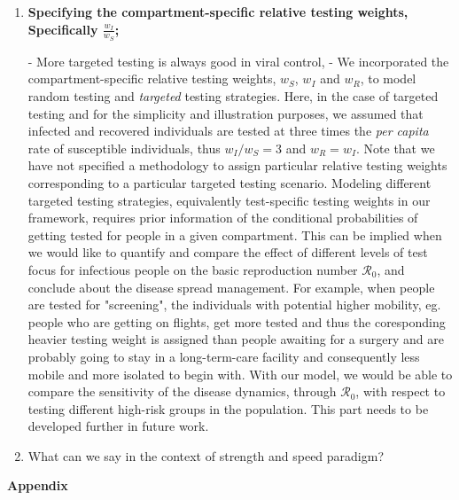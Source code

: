 \documentclass[12pt]{article}
\newcommand{\percap}{\emph{per capita}\xspace}
\newcommand{\Rnum}{\ensuremath{\mathcal{R}_0}}
\DeclareRobustCommand\_{\ifmmode\expandafter\subtxt\else\textunderscore\fi}
\theoremstyle{definition} %
\begin{document}
\begin{enumerate}
\item {\bf Specifying the compartment-specific relative testing weights, Specifically $\frac{w_I}{w_S}$;}

- More targeted testing is always good in viral control,
- We incorporated the compartment-specific relative testing weights, $w_S$, $w_I$ and $w_R$, to model random testing and \emph{targeted} testing strategies. Here, in the case of targeted testing and for the simplicity and illustration purposes, we assumed that infected and recovered individuals are tested at three times the \percap rate of susceptible individuals, thus $w_I/w_S=3$ and $w_R=w_I$. Note that we have not specified a methodology to assign particular relative testing weights corresponding to a particular targeted testing scenario. 
Modeling different targeted testing strategies, equivalently test-specific testing weights in our framework, requires prior information of the conditional probabilities of getting tested for people in a given compartment. 
This can be implied when we would like to quantify and compare the effect of different levels of test focus for infectious people on the basic reproduction number $\Rnum$, and conclude about the disease spread management. For example, when people are tested for "screening", the individuals with potential higher mobility, eg. people who are getting on flights, get more tested and thus the coresponding heavier testing weight is assigned than people awaiting for a surgery and are probably going to stay in a long-term-care facility and consequently less mobile and more isolated to begin with. With our model, we would be able to compare the sensitivity of the disease dynamics, through $\Rnum$, with respect to testing different high-risk groups in the population. This part needs to be developed further in future work.

\item What can we say in the context of strength and speed paradigm?

\end{enumerate}



\clearpage
\begin{center}
\textbf{\large Appendix}
\end{center}
\setcounter{equation}{0}
\setcounter{figure}{0}
\setcounter{table}{0}
\makeatletter
\renewcommand{\theequation}{A\arabic{equation}}
\renewcommand{\thefigure}{A\arabic{figure}}
\renewcommand{\bibnumfmt}[1]{[A#1]}
\renewcommand{\citenumfont}[1]{A#1}
\end{document}
